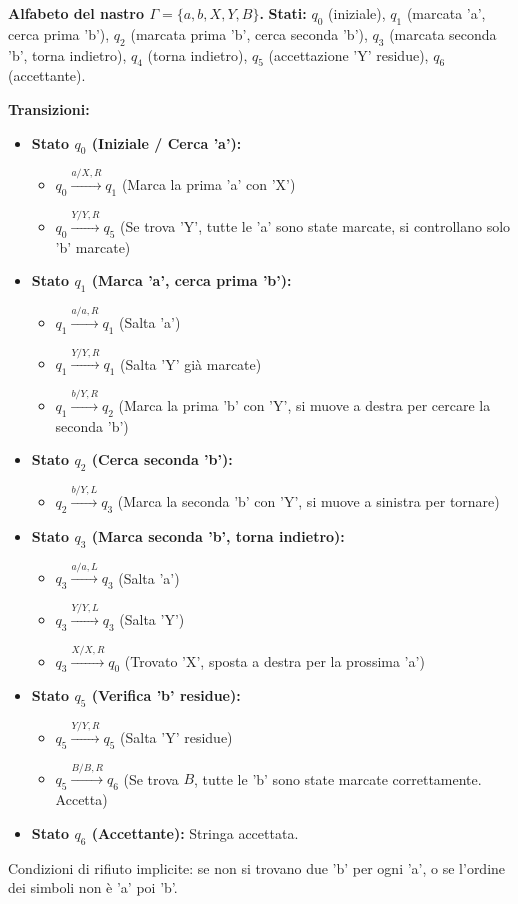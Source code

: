 \documentclass[a4paper]{article}
\begin{document}
\noindent \textbf{Alfabeto del nastro $\Gamma = \{a, b, X, Y, B\}$.}
\noindent \textbf{Stati:} $q_0$ (iniziale), $q_1$ (marcata 'a', cerca prima 'b'), $q_2$ (marcata prima 'b', cerca seconda 'b'), $q_3$ (marcata seconda 'b', torna indietro), $q_4$ (torna indietro), $q_5$ (accettazione 'Y' residue), $q_6$ (accettante).

\noindent \textbf{Transizioni:}
\begin{itemize}
    \item \textbf{Stato $q_0$ (Iniziale / Cerca 'a'):}
        \begin{itemize}
            \item $q_0 \xrightarrow{a / X, R} q_1$ (Marca la prima 'a' con 'X')
            \item $q_0 \xrightarrow{Y / Y, R} q_5$ (Se trova 'Y', tutte le 'a' sono state marcate, si controllano solo 'b' marcate)
        \end{itemize}
    \item \textbf{Stato $q_1$ (Marca 'a', cerca prima 'b'):}
        \begin{itemize}
            \item $q_1 \xrightarrow{a / a, R} q_1$ (Salta 'a')
            \item $q_1 \xrightarrow{Y / Y, R} q_1$ (Salta 'Y' già marcate)
            \item $q_1 \xrightarrow{b / Y, R} q_2$ (Marca la prima 'b' con 'Y', si muove a destra per cercare la seconda 'b')
        \end{itemize}
    \item \textbf{Stato $q_2$ (Cerca seconda 'b'):}
        \begin{itemize}
            \item $q_2 \xrightarrow{b / Y, L} q_3$ (Marca la seconda 'b' con 'Y', si muove a sinistra per tornare)
        \end{itemize}
    \item \textbf{Stato $q_3$ (Marca seconda 'b', torna indietro):}
        \begin{itemize}
            \item $q_3 \xrightarrow{a / a, L} q_3$ (Salta 'a')
            \item $q_3 \xrightarrow{Y / Y, L} q_3$ (Salta 'Y')
            \item $q_3 \xrightarrow{X / X, R} q_0$ (Trovato 'X', sposta a destra per la prossima 'a')
        \end{itemize}
    \item \textbf{Stato $q_5$ (Verifica 'b' residue):}
        \begin{itemize}
            \item $q_5 \xrightarrow{Y / Y, R} q_5$ (Salta 'Y' residue)
            \item $q_5 \xrightarrow{B / B, R} q_6$ (Se trova $B$, tutte le 'b' sono state marcate correttamente. Accetta)
        \end{itemize}
    \item \textbf{Stato $q_6$ (Accettante):} Stringa accettata.
\end{itemize}
Condizioni di rifiuto implicite: se non si trovano due 'b' per ogni 'a', o se l'ordine dei simboli non è 'a' poi 'b'.
\end{document}
